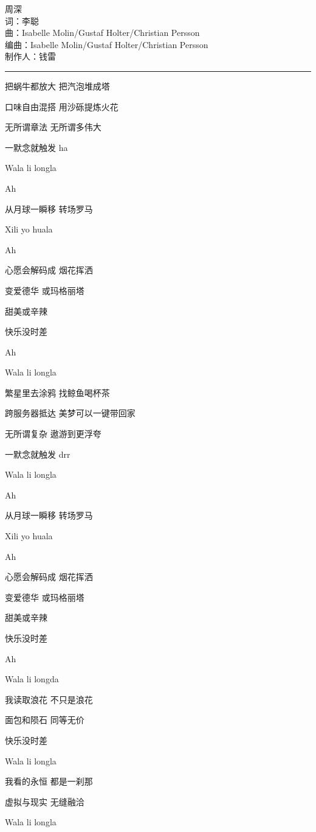\documentclass[]{ctexbook}
\begin{document}
周深\\
词：李聪\\
曲：Isabelle Molin/Gustaf Holter/Christian Persson\\
编曲：Isabelle Molin/Gustaf Holter/Christian Persson\\
制作人：钱雷

\begin{center}\rule{0.5\linewidth}{0.5pt}\end{center}

把蜗牛都放大 把汽泡堆成塔

口味自由混搭 用沙砾提炼火花

无所谓章法 无所谓多伟大

一默念就触发 ha

Wala li longla

Ah

从月球一瞬移 转场罗马

Xili yo huala

Ah

心愿会解码成 烟花挥洒

变爱德华 或玛格丽塔

甜美或辛辣

快乐没时差

Ah

Wala li longla

繁星里去涂鸦 找鲸鱼喝杯茶

跨服务器抵达 美梦可以一键带回家

无所谓复杂 遨游到更浮夸

一默念就触发 drr

Wala li longla

Ah

从月球一瞬移 转场罗马

Xili yo huala

Ah

心愿会解码成 烟花挥洒

变爱德华 或玛格丽塔

甜美或辛辣

快乐没时差

Ah

Wala li longda

我读取浪花 不只是浪花

面包和陨石 同等无价

快乐没时差

Wala li longla

我看的永恒 都是一刹那

虚拟与现实 无缝融洽

Wala li longla
\end{document}
